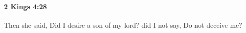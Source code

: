 
		\paragraph{2 Kings 4:28} %
			\label{2KINGS-4-28}

			Then she said, Did I desire a son of my lord? did I not say, Do not deceive me?


